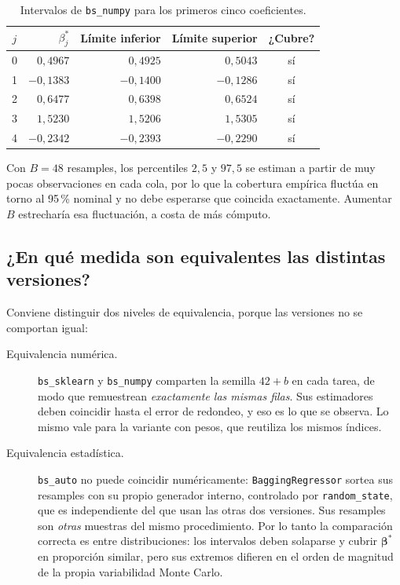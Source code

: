 \documentclass[11pt,letterpaper]{article}
\begin{document}
\begin{table}[H]
\centering
\caption{Intervalos de \texttt{bs\_numpy} para los primeros cinco coeficientes.}
\label{tab:primeros}
\small
\begin{tabular}{crrrc}
\toprule
$j$ & $\beta^*_j$ & \textbf{Límite inferior} & \textbf{Límite superior} & \textbf{¿Cubre?} \\
\midrule
0 & $ 0{,}4967$ & $ 0{,}4925$ & $ 0{,}5043$ & sí \\
1 & $-0{,}1383$ & $-0{,}1400$ & $-0{,}1286$ & sí \\
2 & $ 0{,}6477$ & $ 0{,}6398$ & $ 0{,}6524$ & sí \\
3 & $ 1{,}5230$ & $ 1{,}5206$ & $ 1{,}5305$ & sí \\
4 & $-0{,}2342$ & $-0{,}2393$ & $-0{,}2290$ & sí \\
\bottomrule
\end{tabular}
\end{table}

Con $B = 48$ resamples, los percentiles $2{,}5$ y $97{,}5$ se estiman a partir de muy
pocas observaciones en cada cola, por lo que la cobertura empírica fluctúa en torno al
95\,\% nominal y no debe esperarse que coincida exactamente. Aumentar $B$ estrecharía
esa fluctuación, a costa de más cómputo.

\subsection{¿En qué medida son equivalentes las distintas versiones?}
\label{sec:c-equivalencia}

Conviene distinguir dos niveles de equivalencia, porque las versiones no se comportan
igual:

\begin{description}
\item[Equivalencia numérica.] \texttt{bs\_sklearn} y \texttt{bs\_numpy} comparten la
  semilla $42+b$ en cada tarea, de modo que remuestrean \emph{exactamente las mismas
  filas}. Sus estimadores deben coincidir hasta el error de redondeo, y eso es lo que
  se observa. Lo mismo vale para la variante con pesos, que reutiliza los mismos
  índices.
\item[Equivalencia estadística.] \texttt{bs\_auto} no puede coincidir numéricamente:
  \texttt{BaggingRegressor} sortea sus resamples con su propio generador interno,
  controlado por \texttt{random\_state}, que es independiente del que usan las otras
  dos versiones. Sus resamples son \emph{otras} muestras del mismo procedimiento. Por
  lo tanto la comparación correcta es entre distribuciones: los intervalos deben
  solaparse y cubrir $\boldsymbol{\beta}^*$ en proporción similar, pero sus extremos
  difieren en el orden de magnitud de la propia variabilidad Monte Carlo.
\end{description}
\end{document}
